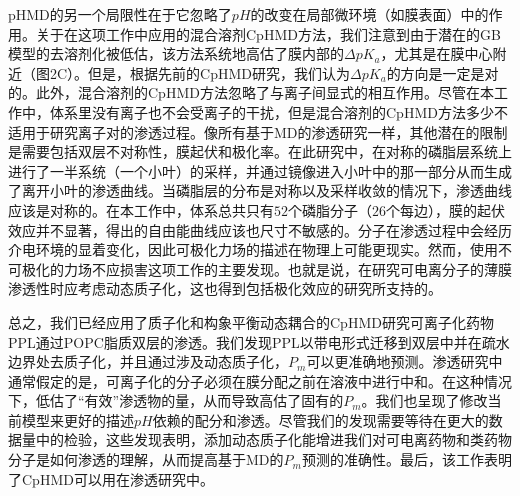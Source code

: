 \documentclass[journal=,manuscript=artical,email=false]{achemso}
\begin{document}
pHMD的另一个局限性在于它忽略了$pH$的改变在局部微环境（如膜表面）中的作用。关于在这项工作中应用的混合溶剂CpHMD方法，我们注意到由于潜在的GB模型的去溶剂化被低估，该方法系统地高估了膜内部的$\Delta pK_a$，尤其是在膜中心附近（图2C）。但是，根据先前的CpHMD研究，我们认为$\Delta pK_a$的方向是一定是对的。此外，混合溶剂的CpHMD方法忽略了与离子间显式的相互作用。尽管在本工作中，体系里没有离子也不会受离子的干扰，但是混合溶剂的CpHMD方法多少不适用于研究离子对的渗透过程。像所有基于MD的渗透研究一样，其他潜在的限制是需要包括双层不对称性，膜起伏和极化率。在此研究中，在对称的磷脂层系统上进行了一半系统（一个小叶）的采样，并通过镜像进入小叶中的那一部分从而生成了离开小叶的渗透曲线。当磷脂层的分布是对称以及采样收敛的情况下，渗透曲线应该是对称的。在本工作中，体系总共只有$52$个磷脂分子（$26$个每边），膜的起伏效应并不显著，得出的自由能曲线应该也尺寸不敏感的。分子在渗透过程中会经历介电环境的显着变化，因此可极化力场的描述在物理上可能更现实。然而，使用不可极化的力场不应损害这项工作的主要发现。也就是说，在研究可电离分子的薄膜渗透性时应考虑动态质子化，这也得到包括极化效应的研究所支持的。

总之，我们已经应用了质子化和构象平衡动态耦合的CpHMD研究可离子化药物PPL通过POPC脂质双层的渗透。我们发现PPL以带电形式迁移到双层中并在疏水边界处去质子化，并且通过涉及动态质子化，$P_m$可以更准确地预测。渗透研究中通常假定的是，可离子化的分子必须在膜分配之前在溶液中进行中和。在这种情况下，低估了“有效”渗透物的量，从而导致高估了固有的$P_m$。我们也呈现了修改当前模型来更好的描述$pH$依赖的配分和渗透。尽管我们的发现需要等待在更大的数据量中的检验，这些发现表明，添加动态质子化能增进我们对可电离药物和类药物分子是如何渗透的理解，从而提高基于MD的$P_m$预测的准确性。最后，该工作表明了CpHMD可以用在渗透研究中。





%
%
%

%
\end{document}
